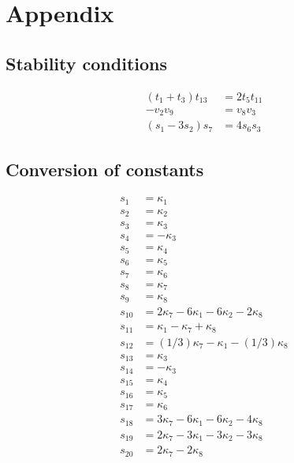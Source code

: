 \documentclass[11pt]{article}
\begin{document}
\section{Appendix} \label{sec_appen}

\subsection{Stability conditions}

\begin{align}
	\left(t_1 + t_3 \right) t_13 &= 2 t_5 t_11\\
	- v_2 v_9 &= v_8 v_3 \\
	\left( s_1 - 3 s_2 \right) s_7 &= 4 s_6 s_3
\end{align}

\subsection{Conversion of constants}

\begin{align}
s_{1} &= \kappa_1\\
s_{2} &= \kappa_2\\
s_{3} &= \kappa_3\\
s_{4} &= -\kappa_3\\
s_{5} &= \kappa_4\\
s_{6} &= \kappa_5\\
s_{7} &= \kappa_6\\
s_{8} &= \kappa_7\\
s_{9} &= \kappa_8\\
s_{10} &= 2  \kappa_7 - 6  \kappa_1 - 6  \kappa_2 - 2  \kappa_8\\
s_{11} &= \kappa_1 - \kappa_7 + \kappa_8\\
s_{12} &= (1/3)  \kappa_7 - \kappa_1 - (1/3)  \kappa_8\\
s_{13} &= \kappa_3\\
s_{14} &= -\kappa_3\\
s_{15} &= \kappa_4\\
s_{16} &= \kappa_5\\
s_{17} &= \kappa_6\\
s_{18} &= 3  \kappa_7 - 6  \kappa_1 - 6  \kappa_2 - 4  \kappa_8\\
s_{19} &= 2  \kappa_7 - 3  \kappa_1 - 3  \kappa_2 - 3  \kappa_8\\
s_{20} &= 2  \kappa_7 - 2  \kappa_8
\end{align}
\end{document}
